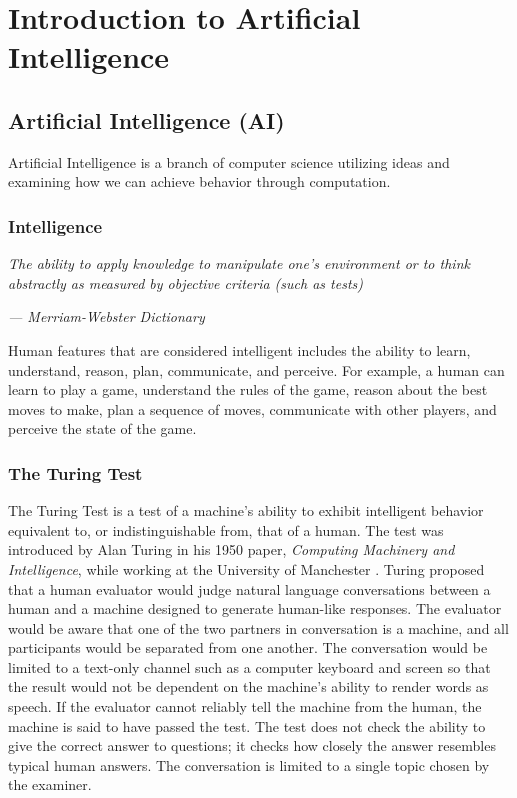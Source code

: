 \chapter{Introduction to Artificial Intelligence}

\section{Artificial Intelligence (AI)}

Artificial Intelligence is a branch of computer science utilizing  ideas and examining how we can achieve  behavior through computation.

\subsection{Intelligence}

\textit{The ability to apply knowledge to manipulate one's environment or to think abstractly as measured by objective criteria (such as tests)}
\begin{flushright}
    \textit{--- Merriam-Webster Dictionary}
\end{flushright}

Human features that are considered intelligent includes the ability to learn, understand, reason, plan, communicate, and perceive. For example, a human can learn to play a game, understand the rules of the game, reason about the best moves to make, plan a sequence of moves, communicate with other players, and perceive the state of the game.

\subsection{The Turing Test}

The Turing Test is a test of a machine's ability to exhibit intelligent behavior equivalent to, or indistinguishable from, that of a human. The test was introduced by Alan Turing in his 1950 paper, \textit{Computing Machinery and Intelligence}, while working at the University of Manchester \cite{10.1093/mind/LIX.236.433}. Turing proposed that a human evaluator would judge natural language conversations between a human and a machine designed to generate human-like responses. The evaluator would be aware that one of the two partners in conversation is a machine, and all participants would be separated from one another. The conversation would be limited to a text-only channel such as a computer keyboard and screen so that the result would not be dependent on the machine's ability to render words as speech. If the evaluator cannot reliably tell the machine from the human, the machine is said to have passed the test. The test does not check the ability to give the correct answer to questions; it checks how closely the answer resembles typical human answers. The conversation is limited to a single topic chosen by the examiner.

